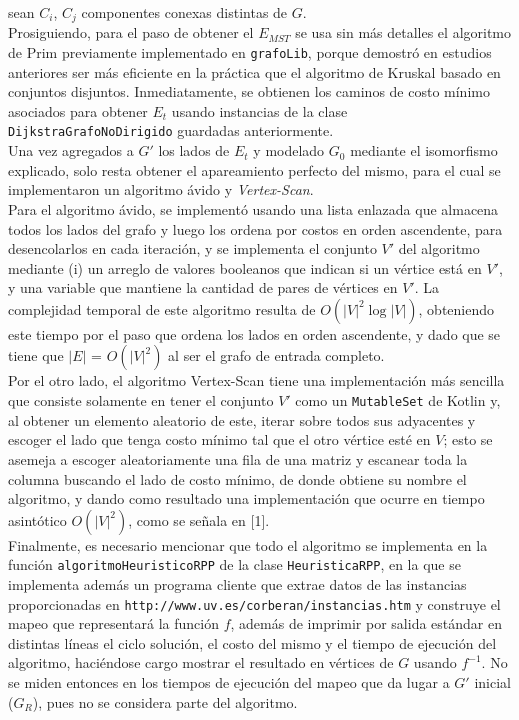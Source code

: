 \documentclass[11pt]{article}
\begin{document}
sean $C_i$, $C_j$ componentes conexas distintas de $G$. \\

Prosiguiendo, para el paso de obtener el $E_{MST}$ se usa sin más detalles el algoritmo
de Prim previamente implementado en \texttt{grafoLib}, porque demostró en estudios
anteriores ser más eficiente en la práctica que el algoritmo de Kruskal basado en
conjuntos disjuntos. Inmediatamente, se obtienen los caminos de costo mínimo asociados
para obtener $E_t$ usando instancias de la clase \texttt{DijkstraGrafoNoDirigido} guardadas
anteriormente. \\

Una vez agregados a $G'$ los lados de $E_t$ y modelado $G_0$ mediante el isomorfismo 
explicado, solo resta obtener el apareamiento perfecto del mismo, para el cual se
implementaron un algoritmo ávido y \emph{Vertex-Scan}. \\

Para el algoritmo ávido, se implementó usando una lista enlazada que almacena todos
los lados del grafo y luego los ordena por costos en orden ascendente, para
desencolarlos en cada iteración, y se implementa el conjunto $V'$ del
algoritmo mediante (i) un arreglo de valores booleanos que indican si un 
vértice está en $V'$, y una variable que mantiene la cantidad de pares de vértices
en $V'$. La complejidad temporal de este algoritmo resulta de $O(|V|^2\log|V|)$,
obteniendo este tiempo por el paso que ordena los lados en orden ascendente, y
dado que se tiene que $|E|$ = $O(|V|^2)$ al ser el grafo de entrada completo. \\

Por el otro lado, el algoritmo Vertex-Scan tiene una implementación más
sencilla que consiste solamente en tener el conjunto $V'$ como un \texttt{MutableSet}
de Kotlin y, al obtener un elemento aleatorio de este, iterar sobre todos sus adyacentes
y escoger el lado que tenga costo mínimo tal que el otro vértice esté en $V$; esto se 
asemeja a escoger aleatoriamente una fila de una matriz y escanear toda la columna
buscando el lado de costo mínimo, de donde obtiene su nombre el algoritmo, y dando 
como resultado una implementación que ocurre en tiempo asintótico $O(|V|^2)$, como
se señala en [1]. \\

Finalmente, es necesario mencionar que todo el algoritmo se implementa
en la función \texttt{algoritmoHeuristicoRPP} de la clase \texttt{HeuristicaRPP},
en la que se implementa además un programa cliente que extrae datos de las instancias
proporcionadas en \texttt{http://www.uv.es/corberan/instancias.htm} y construye
el mapeo que representará la función $f$, además de imprimir por salida estándar
en distintas líneas el ciclo solución, el costo del mismo y el tiempo de ejecución
del algoritmo, haciéndose cargo mostrar el resultado en vértices de $G$ usando $f^{-1}$.
No se miden entonces en los tiempos de ejecución del mapeo que da lugar a $G'$ inicial
($G_R$), pues no se considera parte del algoritmo. \\
\end{document}
